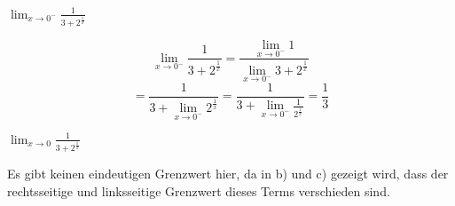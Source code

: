 \begin{minipage}[t]{0.5\textwidth}
    \begin{subtask}
        $\lim_{x\to0^-}\frac{1}{3+2^{\frac{1}{x}}}$
    \end{subtask}
    \begin{solution}
        \[
            \lim_{x\to0^-}\frac{1}{3+2^{\frac{1}{x}}}
            =\frac{\lim_{x\to0^-}1}{\lim_{x\to0^-}3+2^{\frac{1}{x}}}
        \]
        \[
            =\frac{1}{3+\lim_{x\to0^-}2^{\frac{1}{x}}}
            =\frac{1}{3+\lim_{x\to0^-}\frac{1}{2^{\frac{1}{x}}}}=\frac13
        \]
    \end{solution}
\end{minipage} %
\begin{minipage}[t]{0.5\textwidth}
    \begin{subtask}
        $\lim_{x\to0}\frac{1}{3+2^{\frac{1}{x}}}$
    \end{subtask}
    \begin{solution}
        Es gibt keinen eindeutigen Grenzwert hier, da in b) und c) gezeigt wird, dass der rechtsseitige und linksseitige Grenzwert dieses Terms verschieden sind.
    \end{solution}
\end{minipage}